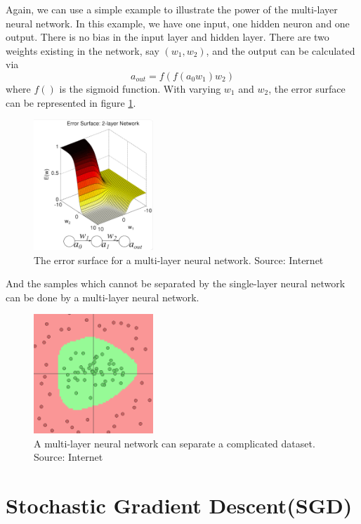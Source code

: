 Again, we can use a simple example to illustrate the power of the multi-layer neural network. In this example, we have one input, one hidden neuron and one output. There is no bias in the input layer and hidden layer. There are two weights existing in the network, say $(w_{1}, w_{2})$, and the output can be calculated via
\begin{equation}\label{eq:2LayerExample}
a_{out} = f(f(a_{0}w_{1})w_{2})
\end{equation}
where $f()$ is the sigmoid function. With varying $w_{1}$ and $w_{2}$, the error surface can be represented in figure \ref{fig:2LayerErrorSurface}.
\graphicspath{ {./Figures/} }
\begin{figure}[!htb]
\centering
\includegraphics[width=0.4\textwidth]{2LayerErrorSurface.png}
\caption{\label{fig:2LayerErrorSurface}The error surface for a multi-layer neural network. Source: Internet}
\end{figure}
And the samples which cannot be separated by the single-layer neural network can be done by a multi-layer neural network.
\graphicspath{ {./Figures/} }
\begin{figure}[!htb]
\centering
\includegraphics[width=0.4\textwidth]{MultiLayerCircleData.png}
\caption{\label{fig:MultiLayerErrorSurface}A multi-layer neural network can separate a complicated dataset. Source: Internet}
\end{figure}

\section{Stochastic Gradient Descent(SGD)}

